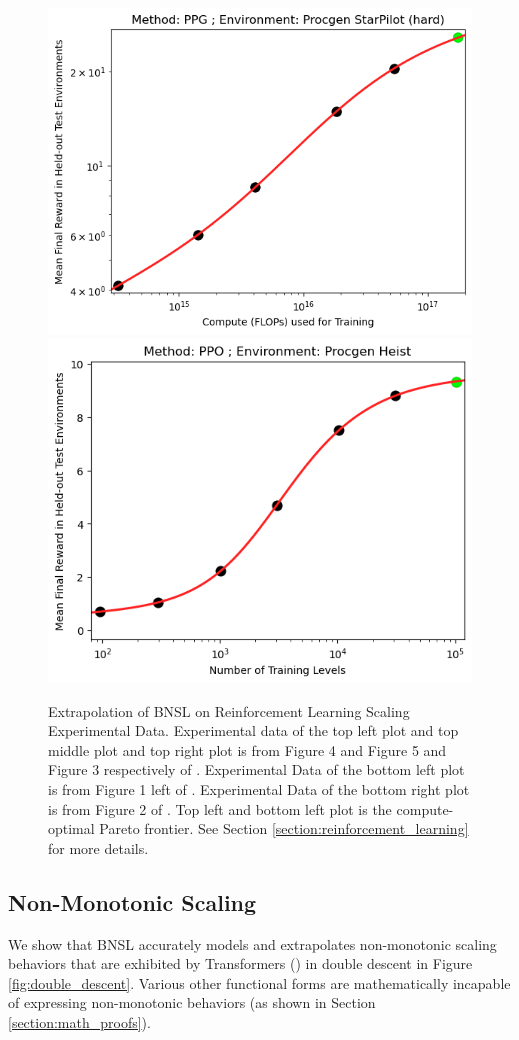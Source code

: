 \documentclass{article} %
\begin{document}
\begin{figure}[hhh]
\includegraphics[width=.34\textwidth]{figures/rl/procgen/Procgen_StarPilot_width_compute.png}
\includegraphics[width=.33\textwidth]{figures/rl/procgen/Procgen_Heist.png}
\vspace{-4.0mm}
    \caption{
    Extrapolation of BNSL on Reinforcement Learning Scaling Experimental Data. Experimental data of the top left plot and top middle plot and top right plot is from Figure 4 and Figure 5 and Figure 3 respectively of \cite{neumann2022scaling}. Experimental Data of the bottom left plot is from Figure 1 left of \cite{hilton2023scaling}. Experimental Data of the bottom right plot is from Figure 2 of \cite{cobbe2020leveraging}. Top left and bottom left plot is the compute-optimal Pareto frontier. See Section \ref{section:reinforcement_learning} for more details.
    }
    \label{fig:rl_scaling}
\end{figure}
\FloatBarrier

\vspace{-3.1mm}

\subsection{Non-Monotonic Scaling}
\label{section:non-monotonic_scaling}
\vspace{-3.2mm}
We show that BNSL accurately models and extrapolates non-monotonic scaling behaviors that are exhibited by Transformers (\cite{vaswani2017attention}) in double descent \citep{nakkiran2021deep} in Figure \ref{fig:double_descent}. Various other functional forms are mathematically incapable of expressing non-monotonic behaviors (as shown in Section \ref{section:math_proofs}).
\end{document}
